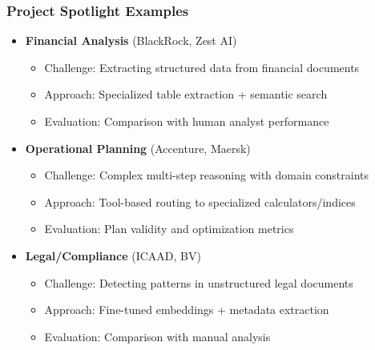{    \begin{frame}
        \frametitle{Project Spotlight Examples}
        \begin{itemize}
            \item \textbf{Financial Analysis} (BlackRock, Zest AI)
            \begin{itemize}
                \item Challenge: Extracting structured data from financial documents
                \item Approach: Specialized table extraction + semantic search
                \item Evaluation: Comparison with human analyst performance
            \end{itemize}
            \item \textbf{Operational Planning} (Accenture, Maersk)
            \begin{itemize}
                \item Challenge: Complex multi-step reasoning with domain constraints
                \item Approach: Tool-based routing to specialized calculators/indices
                \item Evaluation: Plan validity and optimization metrics
            \end{itemize}
            \item \textbf{Legal/Compliance} (ICAAD, BV)
            \begin{itemize}
                \item Challenge: Detecting patterns in unstructured legal documents
                \item Approach: Fine-tuned embeddings + metadata extraction
                \item Evaluation: Comparison with manual analysis
            \end{itemize}
        \end{itemize}
    \end{frame}

}
